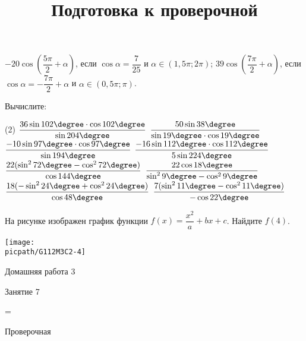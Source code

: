 \begin{class}[number=5]
\begin{listofex}
\begin{tasks}
			\task \( -20 \cos \left( \dfrac{ 5\pi }{ 2 }+ \alpha \right) \), если \( \cos \alpha = \dfrac{ 7 }{ 25 } \) и \( \alpha \in (1,5\pi; 2\pi) \);
			\task \( 39 \cos \left( \dfrac{ 7\pi }{ 2 } + \alpha \right) \), если \( \cos \alpha = -\dfrac{ 7\pi }{ 2 } + \alpha \) и \( \alpha \in (0,5\pi;\pi) \).
		\end{tasks}
		\item Вычислите:
		\begin{tasks}(2)
			\task \( \dfrac{ 36 \sin 102 \degree \cdot \cos 102 \degree }{ \sin 204 \degree } \)
			\task \( \dfrac{ 50 \sin 38 \degree }{ \sin 19 \degree \cdot \cos 19 \degree } \)
			\task \( \dfrac{ -10 \sin 97 \degree \cdot \cos 97 \degree }{ \sin 194 \degree } \)
			\task \( \dfrac{ -16 \sin 112 \degree \cdot \cos 112 \degree }{ 5 \sin 224 \degree } \)
			\task \( \dfrac{22 (\sin^2 72 \degree - \cos^2 72 \degree)}{ \cos 144 \degree } \)
			\task \( \dfrac{ 22 \cos 18 \degree }{ \sin^2 9 \degree - \cos^2 9 \degree  } \)
			\task \( \dfrac{ 18(-\sin^2 24 \degree + \cos^2 24 \degree) }{ \cos 48 \degree } \)
			\task \( \dfrac{ 7(\sin^2 11 \degree - \cos^2 11 \degree) }{ -\cos 22 \degree } \)
		\end{tasks}
	\end{listofex}
\end{class}

\begin{class}[number=6]
	\begin{listofex}
		\item
		\begin{minipage}[t]{\bodywidth}
			На рисунке изображен график функции \( f(x)=\dfrac{x^2}{a}+bx+c \). Найдите \( f(4) \).
		\end{minipage}
		\begin{minipage}[t]{\picwidth}
			\texttt{[image: \\picpath/G112M3C2-4]}
		\end{minipage}
	\end{listofex}
\end{class}

\begin{homework}[number=3]
	\begin{listofex}
		\item Домашняя работа 3
	\end{listofex}
\end{homework}

\begin{class}[number=7]
	\title{Подготовка к проверочной}
	\begin{listofex}
		\item Занятие 7
	\end{listofex}
\end{class}

=%
\begin{exam}
	\begin{listofex}
		\item Проверочная
	\end{listofex}
\end{exam}
